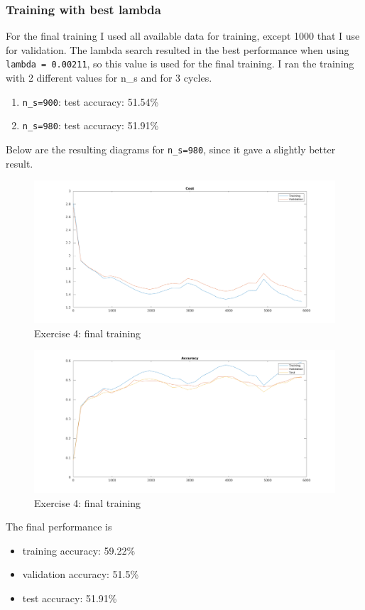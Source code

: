 \subsubsection{Training with best lambda}
For the final training I used all available data for training, except 1000 that I use for validation.
The lambda search resulted in the best performance when using \texttt{lambda = 0.00211}, so this value is used for the final training.
I ran the training with 2 different values for n\_s and for 3 cycles. 
\begin{enumerate}[label=(\arabic*)]
    \item \texttt{n\_s=900}: test accuracy: 51.54\% 
    \item \texttt{n\_s=980}: test accuracy: 51.91\%
\end{enumerate}
Below are the resulting diagrams for \texttt{n\_s=980}, since it gave a slightly better result.
    \begin{figure}[ht]
        \includegraphics[width=\textwidth]{../code/result_pics/cost_lambda=0.00211_ns=980_cycles=3.png}
        \caption{Exercise 4: final training}
    \end{figure}
    \begin{figure}[ht]
        \includegraphics[width=\textwidth]{../code/result_pics/accuracy_lambda=0.00211_ns=980_cycles=3.png}
        \caption{Exercise 4: final training}
    \end{figure}
\clearpage
The final performance is 
\begin{itemize}
    \item training accuracy: 59.22\%
    \item validation accuracy: 51.5\%
    \item test accuracy: 51.91\%
\end{itemize}
